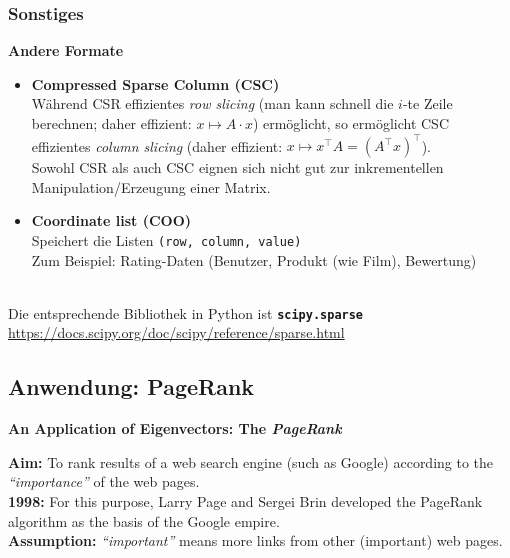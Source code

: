 \subsubsection{Sonstiges}
\textbf{Andere Formate}
\begin{itemize}
	\item \textbf{Compressed Sparse Column (CSC)}\\
	Während CSR effizientes \textit{row slicing} (man kann schnell die $i$-te Zeile berechnen; daher effizient: $x \mapsto A\cdot x$) ermöglicht, so ermöglicht CSC effizientes \textit{column slicing} (daher effizient: $x \mapsto x^\top A = (A^\top x)^\top$).\\
	Sowohl CSR als auch CSC eignen sich nicht gut zur inkrementellen Manipulation/Erzeugung einer Matrix.
	\item \textbf{Coordinate list (COO)}\\
	Speichert die Listen \texttt{(row, column, value)}\\
	Zum Beispiel: Rating-Daten (Benutzer, Produkt (wie Film), Bewertung)
\end{itemize}
~\\
Die entsprechende Bibliothek in Python ist \textbf{\texttt{scipy.sparse}}\\
\url{https://docs.scipy.org/doc/scipy/reference/sparse.html}


\subsection{Anwendung: PageRank}
\textbf{An Application of Eigenvectors: The \textit{PageRank}}

\textbf{Aim:} To rank results of a web search engine (such as Google) according to the \textit{``importance''} of the web pages.\\

\textbf{1998:} For this purpose, Larry Page and Sergei Brin developed the PageRank algorithm as the basis of the 
Google empire.\\ 

\textbf{Assumption:} \textit{``important''} means more links from other (important) web pages.\\


